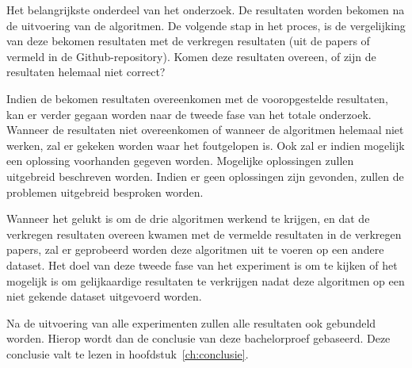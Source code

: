 Het belangrijkste onderdeel van het onderzoek. De resultaten worden bekomen na de uitvoering van de algoritmen. De volgende stap in het proces, is de vergelijking van deze bekomen resultaten met de verkregen resultaten (uit de papers of vermeld in de Github-repository). Komen deze resultaten overeen, of zijn de resultaten helemaal niet correct? 

Indien de bekomen resultaten overeenkomen met de vooropgestelde resultaten, kan er verder gegaan worden naar de tweede fase van het totale onderzoek. Wanneer de resultaten niet overeenkomen of wanneer de algoritmen helemaal niet werken, zal er gekeken worden waar het foutgelopen is. Ook zal er indien mogelijk een oplossing voorhanden gegeven worden. Mogelijke oplossingen zullen uitgebreid beschreven worden. Indien er geen oplossingen zijn gevonden, zullen de problemen uitgebreid besproken worden.

Wanneer het gelukt is om de drie algoritmen werkend te krijgen, en dat de verkregen resultaten overeen kwamen met de vermelde resultaten in de verkregen papers, zal er geprobeerd worden deze algoritmen uit te voeren op een andere dataset. Het doel van deze tweede fase van het experiment is om te kijken of het mogelijk is om gelijkaardige resultaten te verkrijgen nadat deze algoritmen op een niet gekende dataset uitgevoerd worden.

Na de uitvoering van alle experimenten zullen alle resultaten ook gebundeld worden. Hierop wordt dan de conclusie van deze bachelorproef gebaseerd. Deze conclusie valt te lezen in hoofdstuk~\ref{ch:conclusie}.